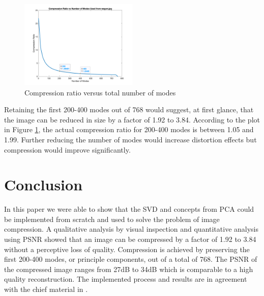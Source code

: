 \documentclass[conference]{IEEEtran}
\begin{document}
    \begin{figure}[t]
    \includegraphics[width=0.5\textwidth]{comprVsModes_rgb}
    \caption{Compression ratio versus total number of modes}
    \label{fig:comprvsr}
    \end{figure}
    
    Retaining the first 200-400 modes out of 768 would suggest, at first glance, that the image can be reduced in size by a factor of 1.92 to 3.84. According to the plot in Figure \ref{fig:comprvsr}, the actual compression ratio for 200-400 modes is between 1.05 and 1.99. Further reducing the number of modes would increase distortion effects but compression would improve significantly.


    \section{Conclusion}

    In this paper we were able to show that the SVD and concepts from PCA could be implemented from scratch and used to solve the problem of image compression. A qualitative analysis by visual inspection and quantitative analysis using PSNR showed that an image can be compressed by a factor of 1.92 to 3.84 without a perceptive loss of quality. Compression is achieved by preserving the first 200-400 modes, or principle components, out of a total of 768. The PSNR of the compressed image ranges from 27dB to 34dB which is comparable to a high quality reconstruction. The implemented process and results are in agreement with the chief material in \cite{jaradet_svd_image_compression}.
    
\end{document}
